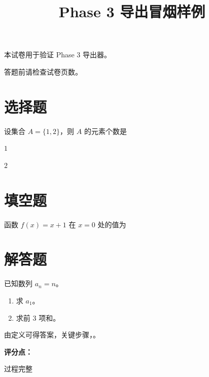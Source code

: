 \documentclass{exam-zh}
\title{Phase 3 导出冒烟样例}
\begin{document}
\secret
\maketitle
本试卷用于验证 Phase 3 导出器。
\begin{notice}
\item 答题前请检查试卷页数。
\end{notice}
\section{选择题}
\begin{question}[points = 5]
设集合 $A=\{1,2\}$，则 $A$ 的元素个数是 \paren[B]
\begin{choices}
\item $1$
\item $2$
\end{choices}
\end{question}
\section{填空题}
\begin{question}[points = 5]
函数 $f(x)=x+1$ 在 $x=0$ 处的值为\fillin[1]
\end{question}
\section{解答题}
\begin{problem}[points = 10]
已知数列 $a_n=n$。
\begin{enumerate}
\item 求 $a_1$。
\item 求前 $3$ 项和。
\end{enumerate}
\end{problem}
\begin{solution}
由定义可得答案，关键步骤，{}。

\textbf{评分点：}

过程完整 
\end{solution}
\end{document}
